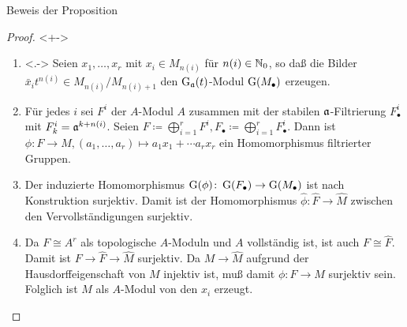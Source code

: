 \begin{frame}{Beweis der Proposition}
	\begin{proof}<+->
		\begin{enumerate}[<+->]
		\item<.->
			Seien \(x_1, \dotsc, x_r\) mit \(x_i \in M_{n(i)}\) für \(n(i) \in \mathbb N_0\), so daß die Bilder
			\(\bar x_i t^{n(i)} \in M_{n(i)}/M_{n(i) + 1}\) den \(\operatorname{G}_{\mathfrak{a}}(t)\)-Modul \(\operatorname{G}(M_\bullet)\) erzeugen.
		\item
			Für jedes \(i\) sei \(F^i\) der \(A\)-Modul \(A\) zusammen mit der stabilen \(\mathfrak{a}\)-Filtrierung \(F^i_\bullet\)
			mit	\(F^i_k = \mathfrak{a}^{k + n(i)}\). Seien \(F \coloneqq\bigoplus\limits_{i = 1}^r F^i, F_\bullet
			\coloneqq \bigoplus\limits_{i = 1}^r F^i_\bullet\). Dann ist
			\(\phi\colon F \to M, (a_1, \dotsc, a_r) \mapsto a_1 x_1 + \dotsb a_r x_r\) ein Homomorphismus filtrierter Gruppen.
		\item
			Der induzierte Homomorphismus \(\operatorname{G}(\phi)\colon \operatorname{G}(F_\bullet) \to \operatorname{G}(M_\bullet)\) ist nach
			Konstruktion surjektiv. Damit ist der Homomorphismus \(\hat\phi\colon \hat F \to \hat M\) zwischen den
			Vervollständigungen surjektiv.
		\item
			Da \(F \cong A^r\) als topologische \(A\)-Moduln und \(A\) vollständig ist, ist auch \(F \cong \hat F\).
			Damit ist \(F \to \hat F \to \hat M\) surjektiv. Da \(M \to \hat M\) aufgrund der Hausdorffeigenschaft von
			\(M\) injektiv ist, muß damit \(\phi\colon F \to M\) surjektiv sein. Folglich ist \(M\)
			als \(A\)-Modul von den \(x_i\) erzeugt.
			\qedhere
		\end{enumerate}
	\end{proof}
\end{frame}

